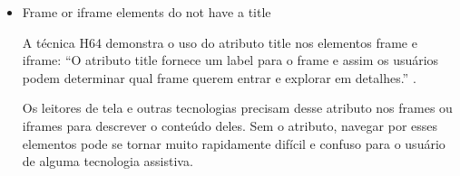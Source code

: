 \documentclass[
	12pt,				%
	openright,			%
	oneside,			%
	a4paper,			%
	chapter=TITLE,		%
	section=TITLE,		%
	subsection=TITLE,	%
	subsubsection=TITLE,%
	english,			%
	brazil				%
	]{abntex2}
\theoremstyle{definition}
\begin{document}
\begin{itemize}
\begin{center}
\begin{minipage}{10cm}
\begin{verbatim}
<object type="application/pdf" data="/report.pdf">
    2019 Web Accessibility Report
</object>
\end{verbatim}
\end{minipage}
\end{center}

\begin{figure}[!h]
\centering
\caption{Ausência do atributo alt no corpo do elemento object}
\label{Ausência do atributo alt no corpo do elemento object}
\end{figure}

Na figura \ref{Ausência do atributo alt no corpo do elemento object} acima pode ser notado que não há um texto alternativo inserido diretamente no corpo do elemento object, por isso ele é acusado com uma falha de acessibilidade. A solução recomendada para este tipo de problema é simplesmente adicionar um texto descritivo seu corpo.

 \item Frame or iframe elements do not have a title
   
A técnica H64 demonstra o uso do atributo title nos elementos frame e iframe: “O atributo title fornece um label para o frame e assim os usuários podem determinar qual frame querem entrar e explorar em detalhes.” \cite{cooper2010techniques}.

Os leitores de tela e outras tecnologias precisam desse atributo nos frames ou iframes para descrever o conteúdo deles. Sem o atributo, navegar por esses elementos pode se tornar muito rapidamente difícil e confuso para o usuário de alguma tecnologia assistiva.


\end{itemize}
\end{document}
